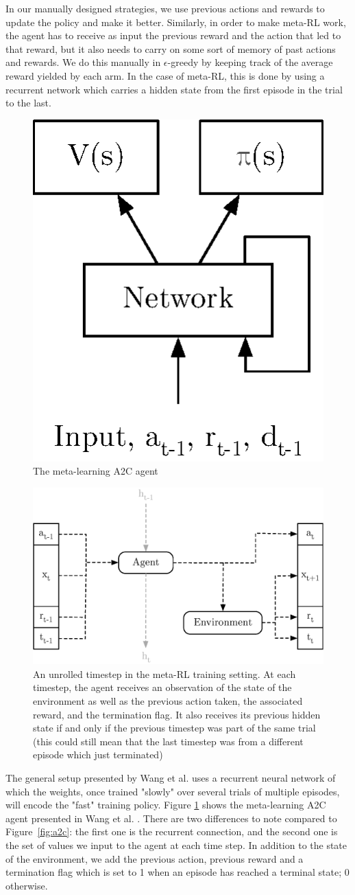 In our manually designed strategies, we use previous actions and rewards
to update the policy and make it better. Similarly, in order to
make meta-RL work, the agent has to receive as input the previous reward
and the action that led to that reward, but it also needs to carry on some
sort of memory of past actions and rewards. We do this manually in 
$\epsilon$-greedy by keeping track of the average reward yielded by each arm.
In the case of meta-RL, this is done by using a recurrent network which
carries a hidden state from the first episode in the trial to the last.\\


\begin{figure}
	\centering
	\includegraphics[width=0.2\linewidth]{fig/a2c_meta.eps}
	\caption{The meta-learning A2C agent}
	\label{fig:a2c_meta}
\end{figure}

\begin{figure}
	\centering
	\includegraphics[width=0.6\linewidth]{fig/meta_rl_timestep.eps}
	\caption{An unrolled timestep in the meta-RL training setting. At each
	timestep, the agent receives an observation of the state of the
	environment as well as the previous action taken, the associated reward,
	and the termination flag. It also receives its previous hidden state
	if and only if the previous timestep was part of the same trial (this
	could still mean that the last timestep was from a different episode
	which just terminated)}
	\label{fig:meta_rl_timestep}
\end{figure}

The general setup presented by Wang et al. uses a recurrent neural network of
which the weights, once trained "slowly" over several trials of multiple
episodes, will encode the "fast" training policy.
Figure \ref{fig:a2c_meta} shows the meta-learning A2C agent presented in Wang
et al. \cite{learningtorl}. There are two differences to note compared to
Figure~\ref{fig:a2c}: the first one is the recurrent connection, and the
second one is the set of values we input to the agent at each time step. In
addition to the state of the environment, we add the previous action, 
previous reward and a termination flag which is set to 1 when an episode
has reached a terminal state; 0 otherwise.\\

